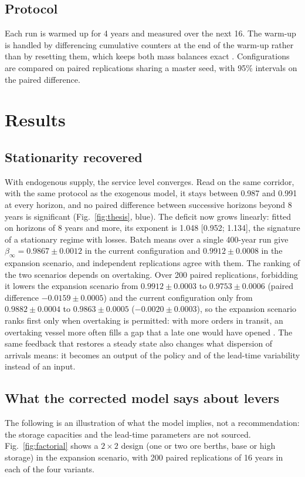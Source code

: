 \documentclass[conference]{IEEEtran}   %
\begin{document}
\subsection{Protocol}
Each run is warmed up for 4 years and measured over the next 16. The warm-up is handled by
differencing cumulative counters at the end of the warm-up rather than by resetting them,
which keeps both mass balances exact \cite{law2015}. Configurations are
compared on paired replications sharing a master seed, with 95\% intervals on the paired
difference.

\section{Results}
\label{sec:results}

\subsection{Stationarity recovered}
With endogenous supply, the service level converges. Read on the same corridor, with the
same protocol as the exogenous model, it stays between 0.987 and 0.991 at every horizon, and
no paired difference between successive horizons beyond 8 years is significant
(Fig.~\ref{fig:thesis}, blue). The deficit now grows linearly: fitted on horizons of 8 years
and more, its exponent is 1.048 [0.952; 1.134], the signature of a stationary regime with
losses. Batch means over a single 400-year run \cite{law2015} give
$\beta_\infty = 0.9867 \pm 0.0012$ in the current configuration and $0.9912 \pm 0.0008$ in
the expansion scenario, and independent replications agree with them. The ranking of the
two scenarios depends on overtaking. Over 200 paired replications, forbidding it lowers the
expansion scenario from $0.9912 \pm 0.0003$ to $0.9753 \pm 0.0006$ (paired difference
$-0.0159 \pm 0.0005$) and the current configuration only from $0.9882 \pm 0.0004$ to
$0.9863 \pm 0.0005$ ($-0.0020 \pm 0.0003$), so the expansion scenario ranks first only when
overtaking is permitted: with more orders in transit, an overtaking vessel more often fills a
gap that a late one would have opened \cite{hayya2008}. The
same feedback that restores a steady state also changes what dispersion of arrivals means:
it becomes an output of the policy and of the lead-time variability instead of an input.

\subsection{What the corrected model says about levers}
The following is an illustration of what the model implies, not a recommendation: the
storage capacities and the lead-time parameters are not sourced. Fig.~\ref{fig:factorial}
shows a $2\times2$ design (one or two ore berths, base or high storage) in the expansion
scenario, with 200 paired replications of 16 years in each of the four variants.
\end{document}
